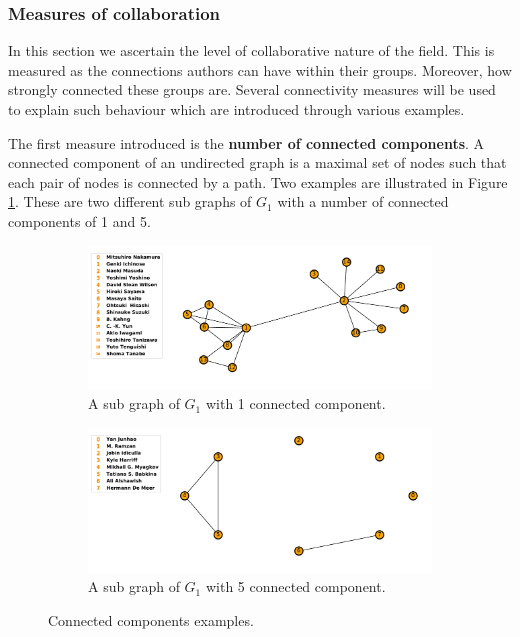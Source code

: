 \documentclass{article}
\theoremstyle{definition}
\begin{document}
\subsubsection{Measures of collaboration}

In this section we ascertain the level of collaborative nature of the field.
This is measured as the connections authors can
have within their groups. Moreover, how strongly connected these groups are.
Several connectivity measures will be used to explain such behaviour which are
introduced through various examples.

The first measure introduced is the \textbf{number of connected components}. A connected
component of an undirected graph is a maximal set of nodes such that each pair
of nodes is connected by a path. Two examples are illustrated in Figure
\ref{fig:connected_components}. These are two different sub graphs of \(G_1\)
with a number of connected components of 1 and 5.

\begin{center}
\begin{figure}[!hbtp]
    \begin{subfigure}{0.5\textwidth}
        \includegraphics[width=\textwidth]{./assets/images/connected_example_one.pdf}
        \caption{A sub graph of \(G_1\) with 1 connected component.}
    \end{subfigure}
    \begin{subfigure}{0.5\textwidth}
        \includegraphics[width=\textwidth]{./assets/images/connected_example_two.pdf}
        \caption{A sub graph of \(G_1\) with 5 connected component.}
    \end{subfigure}
\caption{Connected components examples.}
\label{fig:connected_components}
\end{figure}
\end{center}
\end{document}
